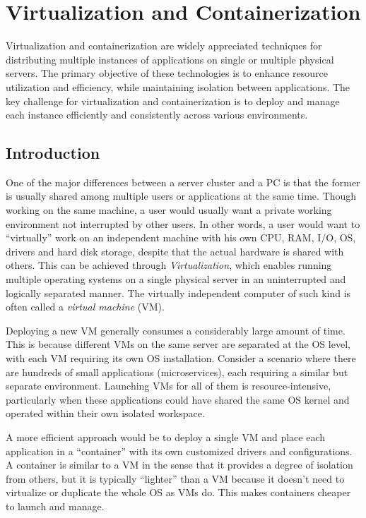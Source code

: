 \chapter{Virtualization and Containerization}

Virtualization and containerization are widely appreciated techniques for distributing multiple instances of applications on single or multiple physical servers. The primary objective of these technologies is to enhance resource utilization and efficiency, while maintaining isolation between applications. The key challenge for virtualization and containerization is to deploy and manage each instance efficiently and consistently across various environments.

\section{Introduction}

One of the major differences between a server cluster and a PC is that the former is usually shared among multiple users or applications at the same time. Though working on the same machine, a user would usually want a private working environment not interrupted by other users. In other words, a user would want to ``virtually'' work on an independent machine with his own CPU, RAM, I/O, OS, drivers and hard disk storage, despite that the actual hardware is shared with others. This can be achieved through \textit{Virtualization}, which enables running multiple operating systems on a single physical server in an uninterrupted and logically separated manner. The virtually independent computer of such kind is often called a \textit{virtual machine} (VM).

Deploying a new VM generally consumes a considerably large amount of time. This is because different VMs on the same server are separated at the OS level, with each VM requiring its own OS installation. Consider a scenario where there are hundreds of small applications (microservices), each requiring a similar but separate environment. Launching VMs for all of them is resource-intensive, particularly when these applications could have shared the same OS kernel and operated within their own isolated workspace.

A more efficient approach would be to deploy a single VM and place each application in a ``container'' with its own customized drivers and configurations. A container is similar to a VM in the sense that it provides a degree of isolation from others, but it is typically ``lighter'' than a VM because it doesn't need to virtualize or duplicate the whole OS as VMs do. This makes containers cheaper to launch and manage.

